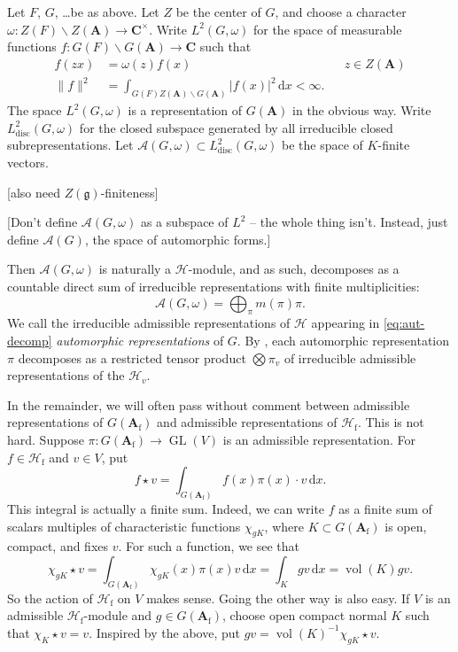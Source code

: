 \documentclass[oneside]{amsart}
\DeclareMathOperator{\GL}{GL}
\DeclareMathOperator{\volume}{vol}
\newcommand{\cA}{\mathcal{A}}
\newcommand{\dA}{\mathbf{A}}
\newcommand{\dC}{\mathbf{C}}
\newcommand{\fg}{\mathfrak{g}}
\newcommand{\dd}{\mathrm{d}}
\newcommand{\discrete}{\mathrm{disc}}
\newcommand{\finite}{\mathrm{f}}
\newcommand{\hecke}{\mathcal{H}}
\begin{document}
Let $F$, $G$, \ldots be as above. Let $Z$ be the center of $G$, and choose a 
character $\omega:Z(F)\backslash Z(\dA)\to \dC^\times$. Write 
$L^2(G,\omega)$ for the space of measurable functions 
$f:G(F)\backslash G(\dA)\to \dC$ such that 
\begin{align*}
  f(z x) &= \omega(z) f(x) && z\in Z(\dA) \\
  \|f\|^2 &= \int_{G(F)Z(\dA)\backslash G(\dA)} |f(x)|^2\, \dd x < \infty .
\end{align*}
The space $L^2(G,\omega)$ is a representation of $G(\dA)$ in the obvious 
way. Write $L_\discrete^2(G,\omega)$ for the closed subspace generated by all 
irreducible closed subrepresentations. Let 
$\cA(G,\omega)\subset L_\discrete^2(G,\omega)$ be the space of $K$-finite 
vectors. 

[also need $Z(\fg)$-finiteness]

[Don't define $\cA(G,\omega)$ as a subspace of $L^2$ -- the whole thing isn't. 
Instead, just define $\cA(G)$, the space of automorphic forms.]

Then $\cA(G,\omega)$ is naturally a $\hecke$-module, and as such, 
decomposes as a countable direct sum of irreducible representations with finite 
multiplicities: 
\begin{equation}\label{eq:aut-decomp}
  \cA(G,\omega) = \bigoplus_\pi m(\pi) \pi .
\end{equation}
We call the irreducible admissible representations of $\hecke$ appearing in 
\eqref{eq:aut-decomp} \emph{automorphic representations} of $G$. By 
\cite[th.4]{f79}, each automorphic representation $\pi$ decomposes as a 
restricted tensor product $\bigotimes \pi_v$ of irreducible admissible 
representations of the $\hecke_v$. 

In the remainder, we will often pass without comment between admissible 
representations of $G(\dA_\finite)$ and admissible representations of 
$\hecke_\finite$. This is not hard. Suppose $\pi:G(\dA_\finite)\to \GL(V)$ is 
an admissible representation. For $f\in \hecke_\finite$ and $v\in V$, put 
\[
  f \star v = \int_{G(\dA_\finite)} f(x) \pi(x)\cdot v\, \dd x.
\]
This integral is actually a finite sum. Indeed, we can write $f$ as a finite 
sum of scalars multiples of characteristic functions $\chi_{g K}$, where 
$K\subset G(\dA_\finite)$ is open, compact, and fixes $v$. For such a function, 
we see that 
\[
  \chi_{g K}\star v = \int_{G(\dA_\finite)}\chi_{g K}(x) \pi(x) v\, \dd x = \int_K g v\, \dd x = \volume(K) g  v. 
\]
So the action of $\hecke_\finite$ on $V$ makes sense. Going the other way is 
also easy. If $V$ is an admissible $\hecke_\finite$-module and 
$g\in G(\dA_\finite)$, choose open compact normal $K$ such that 
$\chi_K\star v=v$. Inspired by the above, put 
$g v = \volume(K)^{-1} \chi_{g K}\star v$. 
\end{document}
